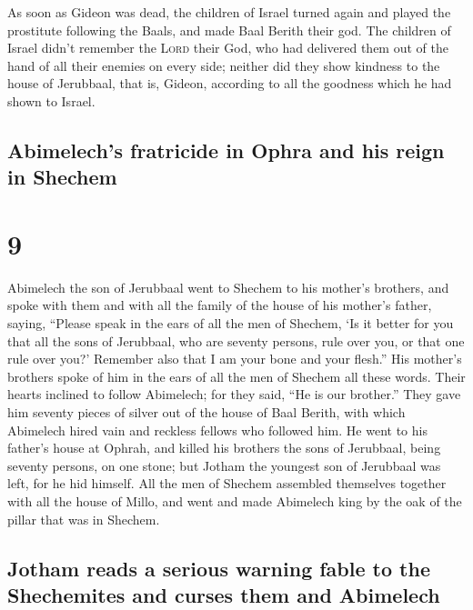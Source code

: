  As soon as Gideon was dead, the children of Israel
turned again and played the prostitute following the Baals, and made
Baal Berith their god.  The children of Israel didn't
remember the \textsc{Lord} their God, who had delivered them out of the
hand of all their enemies on every side;  neither did
they show kindness to the house of Jerubbaal, that is, Gideon, according
to all the goodness which he had shown to Israel.

\hypertarget{abimelechs-fratricide-in-ophra-and-his-reign-in-shechem}{%
\subsection{Abimelech's fratricide in Ophra and his reign in
Shechem}\label{abimelechs-fratricide-in-ophra-and-his-reign-in-shechem}}

\hypertarget{section-8}{%
\section{9}\label{section-8}}

 Abimelech the son of Jerubbaal went to Shechem to his
mother's brothers, and spoke with them and with all the family of the
house of his mother's father, saying,  ``Please speak in
the ears of all the men of Shechem, `Is it better for you that all the
sons of Jerubbaal, who are seventy persons, rule over you, or that one
rule over you?' Remember also that I am your bone and your flesh.''
 His mother's brothers spoke of him in the ears of all the
men of Shechem all these words. Their hearts inclined to follow
Abimelech; for they said, ``He is our brother.''  They
gave him seventy pieces of silver out of the house of Baal Berith, with
which Abimelech hired vain and reckless fellows who followed him.
 He went to his father's house at Ophrah, and killed his
brothers the sons of Jerubbaal, being seventy persons, on one stone; but
Jotham the youngest son of Jerubbaal was left, for he hid himself.
 All the men of Shechem assembled themselves together with
all the house of Millo, and went and made Abimelech king by the oak of
the pillar that was in Shechem.

\hypertarget{jotham-reads-a-serious-warning-fable-to-the-shechemites-and-curses-them-and-abimelech}{%
\subsection{Jotham reads a serious warning fable to the Shechemites and
curses them and
Abimelech}\label{jotham-reads-a-serious-warning-fable-to-the-shechemites-and-curses-them-and-abimelech}}

